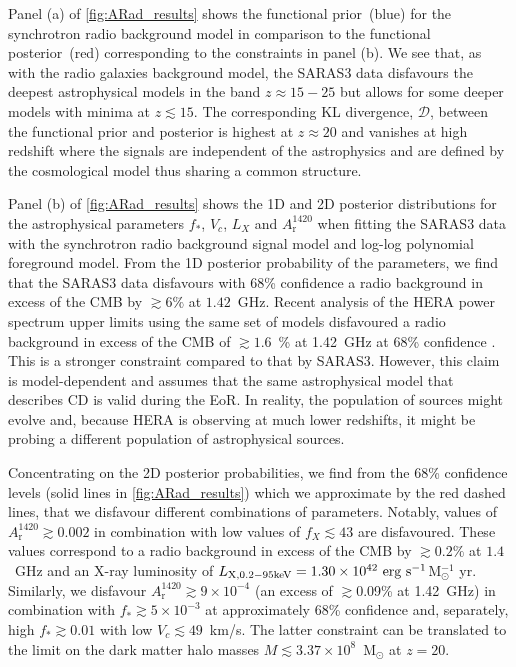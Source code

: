 Panel (a) of \cref{fig:ARad_results} shows the functional prior~(blue) for the synchrotron radio background model in comparison to the functional posterior~(red) corresponding to the constraints in panel (b). We see that, as with the radio galaxies background model, the SARAS3 data disfavours the deepest astrophysical models in the band $z \approx 15 -25$ but allows for some deeper models with minima at $z \lesssim 15$. The corresponding KL divergence, $\mathcal{D}$, between the functional prior and posterior is highest at $z\approx 20$ and vanishes at high redshift where the signals are independent of the astrophysics and are defined by the cosmological model thus sharing a common structure.

Panel (b) of \cref{fig:ARad_results} shows the 1D and 2D posterior distributions for the astrophysical parameters $f_*$, $V_c$, $L_X$ and $A_{\mathrm{r}}^{1420}$ when fitting the SARAS3 data with the synchrotron radio background signal model and log-log polynomial foreground model.  From the 1D posterior probability of the parameters, we find that the SARAS3 data disfavours with 68\% confidence a radio background in excess of the CMB by $\gtrsim6\%$ at $1.42$~GHz. Recent analysis of the HERA power spectrum upper limits using the same set of models disfavoured  a radio background in excess of the CMB of $\gtrsim 1.6$~\% at 1.42~GHz at 68\% confidence \cite{HERA_2022b}. This is a stronger constraint compared to that by SARAS3. However, this claim is model-dependent and assumes that the same astrophysical model that describes CD is valid during the EoR. In reality, the population of sources might evolve and, because HERA is observing at much lower redshifts, it might be probing a different population of astrophysical sources.

Concentrating on the 2D posterior probabilities, we find from the 68\% confidence levels (solid lines in \cref{fig:ARad_results}) which we approximate by the red dashed lines, that we disfavour different combinations of parameters. Notably, values of $A_\mathrm{r}^{1420} \gtrsim 0.002$ in combination with low values of $f_X \lesssim 43$ are disfavoured. These values correspond to a radio background in excess of the CMB by $\gtrsim 0.2\%$ at $1.4$~GHz and an X-ray luminosity of $ L_\mathrm{X, 0.2 - 95 \textnormal{keV}} = 1.30\times10^{42} \textnormal{~erg~s}^{-1}$M$_\odot^{-1}$ yr. Similarly, we disfavour  $A_\mathrm{r}^{1420} \gtrsim 9\times10^{-4}$ (an excess of $\gtrsim$0.09\% at 1.42~GHz) in combination with $f_* \gtrsim 5\times10^{-3}$ at approximately 68\% confidence and, separately, high $f_* \gtrsim 0.01$ with low $V_c \lesssim 49$~km/s. The latter constraint can be translated to the limit on the  dark matter halo masses $M \lesssim 3.37\times10^8$~M$_\odot$ at $z=20$.

